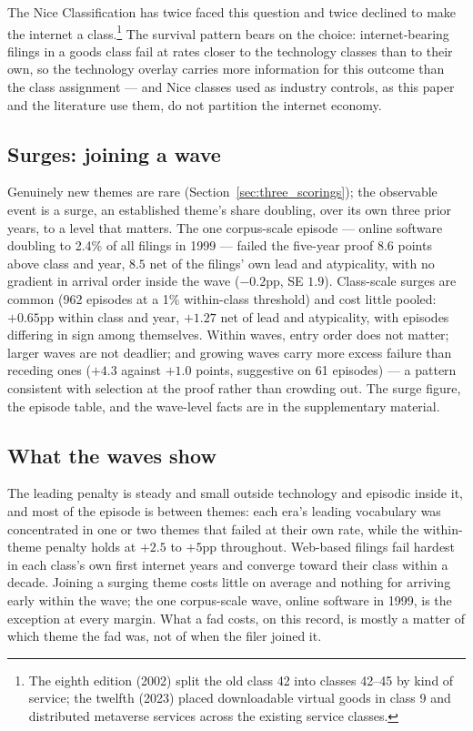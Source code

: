 The Nice Classification has twice faced this question and twice declined
to make the internet a class.\footnote{The eighth edition (2002) split
the old class 42 into classes 42--45 by kind of service; the twelfth
(2023) placed downloadable virtual goods in class 9 and distributed
metaverse services across the existing service classes.} The survival
pattern bears on the choice: internet-bearing filings in a goods class
fail at rates closer to the technology classes than to their own, so the
technology overlay carries more information for this outcome than the
class assignment --- and Nice classes used as industry controls, as this
paper and the literature use them, do not partition the internet economy.

\subsection{Surges: joining a wave}\label{sec:surge}

Genuinely new themes are rare (Section~\ref{sec:three_scorings}); the
observable event is a surge, an established theme's share doubling, over
its own three prior years, to a level that matters. The one corpus-scale
episode --- online software doubling to 2.4\% of all filings in 1999 ---
failed the five-year proof $8.6$ points above class and year, $8.5$ net
of the filings' own lead and atypicality, with no gradient in arrival
order inside the wave ($-0.2$pp, SE $1.9$). Class-scale surges are common
(962 episodes at a 1\% within-class threshold) and cost little pooled:
$+0.65$pp within class and year, $+1.27$ net of lead and atypicality,
with episodes differing in sign among themselves. Within waves, entry
order does not matter; larger waves are not deadlier; and growing waves
carry more excess failure than receding ones ($+4.3$ against $+1.0$
points, suggestive on 61 episodes) --- a pattern consistent with
selection at the proof rather than crowding out. The surge figure, the
episode table, and the wave-level facts are in the supplementary
material.

\subsection{What the waves show}\label{sec:waves_conclusion}

The leading penalty is steady and small outside technology and episodic
inside it, and most of the episode is between themes: each era's leading
vocabulary was concentrated in one or two themes that failed at their own
rate, while the within-theme penalty holds at $+2.5$ to $+5$pp
throughout. Web-based filings fail hardest in each class's own first
internet years and converge toward their class within a decade. Joining a
surging theme costs little on average and nothing for arriving early
within the wave; the one corpus-scale wave, online software in 1999, is
the exception at every margin. What a fad costs, on this record, is
mostly a matter of which theme the fad was, not of when the filer joined
it.
